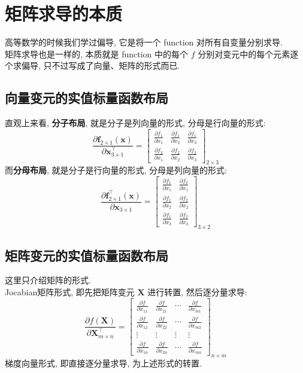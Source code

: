 \documentclass[lang = cn]{elegantpaper}
\begin{document}
\section{矩阵求导的本质}
\noindent
高等数学的时候我们学过偏导, 它是将一个 function 对所有自变量分别求导.\\
矩阵求导也是一样的, 本质就是 function 中的每个 $f$ 分别对变元中的每个元素逐个求偏导, 只不过写成了向量、矩阵的形式而已.
\subsection{向量变元的实值标量函数布局}
\noindent
直观上来看, \textbf{分子布局}, 就是分子是列向量的形式, 分母是行向量的形式:
\begin{equation*}
    \dfrac{\partial \bm{f}_{2 \times 1}(\bm{x})}{\partial \bm{x}_{3 \times 1}^\top} = \begin{bmatrix}
        \frac{\partial f_1}{\partial x_1} & \frac{\partial f_1}{\partial x_2} & \frac{\partial f_1}{\partial x_3} \\
        \frac{\partial f_2}{\partial x_1} & \frac{\partial f_2}{\partial x_2} & \frac{\partial f_2}{\partial x_3}
    \end{bmatrix}_{2 \times 3}
\end{equation*}
而\textbf{分母布局}, 就是分子是行向量的形式, 分母是列向量的形式:
\begin{equation*}
    \dfrac{\partial \bm{f}_{2 \times 1}^\top(\bm{x})}{\partial \bm{x}_{3 \times 1}} = \begin{bmatrix}
        \frac{\partial f_1}{\partial x_1} & \frac{\partial f_2}{\partial x_1} \\
        \frac{\partial f_1}{\partial x_2} & \frac{\partial f_2}{\partial x_2} \\\frac{\partial f_1}{\partial x_3} & \frac{\partial f_2}{\partial x_3}
    \end{bmatrix}_{3 \times 2}
\end{equation*}
\subsection{矩阵变元的实值标量函数布局}
\noindent
这里只介绍矩阵的形式.\\
Jocabian矩阵形式, 即先把矩阵变元 $\bm{X}$ 进行转置, 然后逐分量求导:
\begin{equation*}
    \dfrac{\partial f(\bm{X})}{\partial \bm{X}_{m \times n}^\top} = \begin{bmatrix}
        \frac{\partial f}{\partial x_{11}} & \frac{\partial f}{\partial x_{21}} & \cdots & \frac{\partial f}{\partial x_{m1}}\\
        \frac{\partial f}{\partial x_{12}} & \frac{\partial f}{\partial x_{22}} & \cdots & \frac{\partial f}{\partial x_{m2}}\\
        \vdots & \vdots & \vdots & \vdots \\
        \frac{\partial f}{\partial x_{1n}} & \frac{\partial f}{\partial x_{2n}} & \cdots & \frac{\partial f}{\partial x_{mn}}
    \end{bmatrix}_{n \times m}
\end{equation*}
梯度向量形式, 即直接逐分量求导, 为上述形式的转置.
\end{document}
